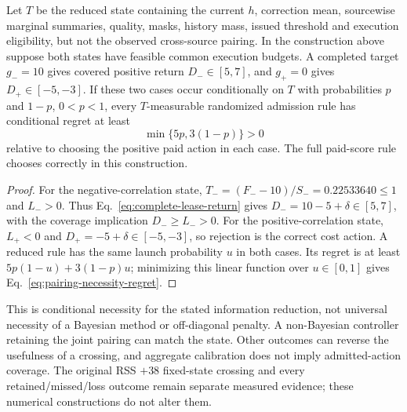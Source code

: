 \begin{corollary}
\label{cor:conditional-pairing-necessity}
Let $T$ be the reduced state containing the current $h$, correction mean,
sourcewise marginal summaries, quality, masks, history mass, issued threshold
and execution eligibility, but not the observed cross-source pairing.
In the construction above suppose both states have feasible common execution
budgets. A completed target $g_-=10$ gives covered positive return
$D_-\in[5,7]$, and $g_+=0$ gives $D_+\in[-5,-3]$.
If these two cases occur conditionally on $T$ with probabilities $p$ and
$1-p$, $0<p<1$, every $T$-measurable randomized admission rule has
conditional regret at least
\begin{equation}
 \min\{5p,3(1-p)\}>0
 \label{eq:pairing-necessity-regret}
\end{equation}
relative to choosing the positive paid action in each case. The full
paid-score rule chooses correctly in this construction.
\end{corollary}
\begin{proof}
For the negative-correlation state,
$T_-=(F_--10)/S_-=0.22533640\le1$ and $L_->0$.
Thus Eq.~\eqref{eq:complete-lease-return} gives
$D_-=10-5+\delta\in[5,7]$, with the coverage implication
$D_-\ge L_->0$. For the positive-correlation state, $L_+<0$ and
$D_+=-5+\delta\in[-5,-3]$, so rejection is the correct cost action.
A reduced rule has the same launch probability $u$ in both cases.
Its regret is at least $5p(1-u)+3(1-p)u$; minimizing this linear function
over $u\in[0,1]$ gives Eq.~\eqref{eq:pairing-necessity-regret}.
\end{proof}

This is conditional necessity for the stated information reduction, not
universal necessity of a Bayesian method or off-diagonal penalty. A
non-Bayesian controller retaining the joint pairing can match the state.
Other outcomes can reverse the usefulness of a crossing, and aggregate
calibration does not imply admitted-action coverage. The original RSS
$+38$ fixed-state crossing and every retained/missed/loss outcome remain
separate measured evidence; these numerical constructions do not alter them.
